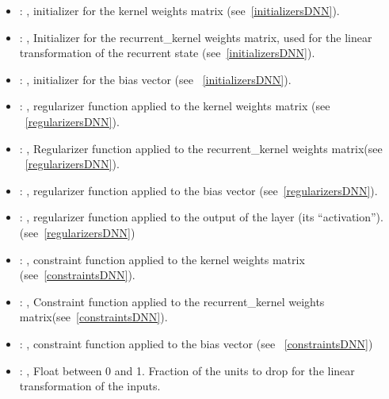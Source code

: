 \begin{itemize}
\begin{itemize}
        \item {}: , 
          initializer for the kernel weights matrix (see~\ref{initializersDNN}).

        \item {}: , 
          Initializer for the recurrent\_kernel weights matrix, used for the linear transformation
          of the         recurrent state (see~\ref{initializersDNN}).

        \item {}: , 
          initializer for the bias vector (see ~\ref{initializersDNN}).

        \item {}: , 
          regularizer function applied to the kernel weights matrix (see ~\ref{regularizersDNN}).

        \item {}: , 
          Regularizer function applied to the recurrent\_kernel weights matrix(see
          ~\ref{regularizersDNN}).

        \item {}: , 
          regularizer function applied to the bias vector (see~\ref{regularizersDNN}).

        \item {}: , 
          regularizer function applied to the output         of the layer (its ``activation'').
          (see~\ref{regularizersDNN})

        \item {}: , 
          constraint function applied to the kernel weights matrix (see~\ref{constraintsDNN}).

        \item {}: , 
          Constraint function applied to the recurrent\_kernel weights
          matrix(see~\ref{constraintsDNN}).

        \item {}: , 
          constraint function applied to the bias vector (see ~\ref{constraintsDNN})

        \item {}: , 
          Float between 0 and 1. Fraction of the units to drop for the linear transformation of the
          inputs.


\end{itemize}
\end{itemize}
